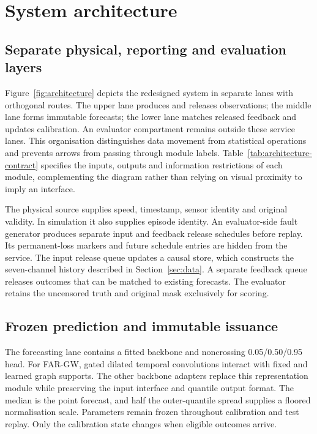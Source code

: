 \section{System architecture}\label{sec:architecture}
\subsection{Separate physical, reporting and evaluation layers}
Figure~\ref{fig:architecture} depicts the redesigned system in separate lanes with orthogonal routes. The upper lane produces and releases observations; the middle lane forms immutable forecasts; the lower lane matches released feedback and updates calibration. An evaluator compartment remains outside these service lanes. This organisation distinguishes data movement from statistical operations and prevents arrows from passing through module labels. Table~\ref{tab:architecture-contract} specifies the inputs, outputs and information restrictions of each module, complementing the diagram rather than relying on visual proximity to imply an interface.

The physical source supplies speed, timestamp, sensor identity and original validity. In simulation it also supplies episode identity. An evaluator-side fault generator produces separate input and feedback release schedules before replay. Its permanent-loss markers and future schedule entries are hidden from the service. The input release queue updates a causal store, which constructs the seven-channel history described in Section~\ref{sec:data}. A separate feedback queue releases outcomes that can be matched to existing forecasts. The evaluator retains the uncensored truth and original mask exclusively for scoring.

\subsection{Frozen prediction and immutable issuance}
The forecasting lane contains a fitted backbone and noncrossing 0.05/0.50/0.95 head. For FAR-GW, gated dilated temporal convolutions interact with fixed and learned graph supports. The other backbone adapters replace this representation module while preserving the input interface and quantile output format. The median is the point forecast, and half the outer-quantile spread supplies a floored normalisation scale. Parameters remain frozen throughout calibration and test replay. Only the calibration state changes when eligible outcomes arrive.

